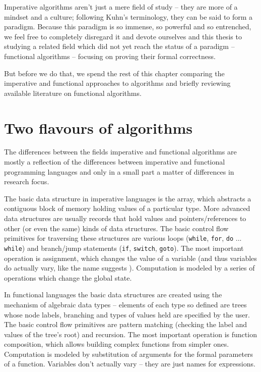 \documentclass[declaration,mgr,english,shortabstract]{iithesis}
\newcommand{\m}[1]{\texttt{#1}}
\begin{document}
Imperative algorithms aren't just a mere field of study -- they are more of a mindset and a culture; following Kuhn's \cite{Kuhn} terminology, they can be said to form a paradigm. Because this paradigm is so immense, so powerful and so entrenched, we feel free to completely disregard it and devote ourselves and this thesis to studying a related field which did not yet reach the status of a paradigm -- functional algorithms -- focusing on proving their formal correctness.

But before we do that, we spend the rest of this chapter comparing the imperative and functional approaches to algorithms and briefly reviewing available literature on functional algorithms.

\section{Two flavours of algorithms} \label{impfun}

The differences between the fields imperative and functional algorithms are mostly a reflection of the differences between imperative and functional programming languages and only in a small part a matter of differences in research focus.

The basic data structure in imperative languages is the array, which abstracts a contiguous block of memory holding values of a particular type. More advanced data structures are usually records that hold values and pointers/references to other (or even the same) kinds of data structures. The basic control flow primitives for traversing these structures are various loops (\m{while}, \m{for}, \m{do} ... \m{while}) and branch/jump statements (\m{if}, \m{switch}, \m{goto}). The most important operation is assignment, which changes the value of a variable (and thus variables do actually vary, like the name suggests \cite{WordsMatter}). Computation is modeled by a series of operations which change the global state.

In functional languages the basic data structures are created using the mechanism of algebraic data types -- elements of each type so defined are trees whose node labels, branching and types of values held are specified by the user. The basic control flow primitives are pattern matching (checking the label and values of the tree's root) and recursion. The most important operation is function composition, which allows building complex functions from simpler ones. Computation is modeled by substitution of arguments for the formal parameters of a function. Variables don't actually vary -- they are just names for expressions. \cite{WordsMatter}
\end{document}
